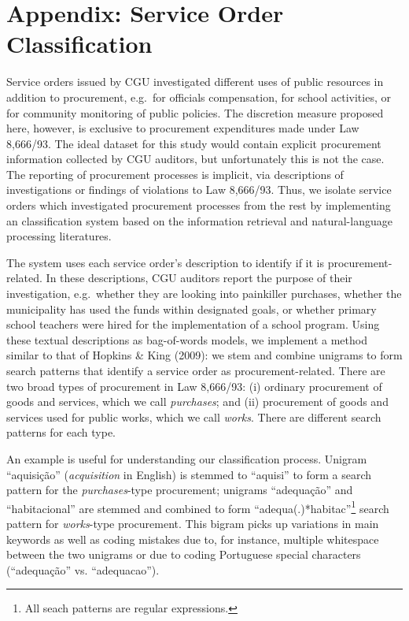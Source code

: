 \documentclass[]{article}
\title{}
\author{}
\date{}
\let\rmarkdownfootnote\footnote%
\def\footnote{\protect\rmarkdownfootnote}
\theoremstyle{definition}
\theoremstyle{definition}
\theoremstyle{definition}
\theoremstyle{remark}
\begin{document}
\hypertarget{appendix-appendix}{%
\appendix}


\hypertarget{appendixA}{%
\section{Appendix: Service Order Classification}\label{appendixA}}

Service orders issued by CGU investigated different uses of public
resources in addition to procurement, e.g.~for officials compensation,
for school activities, or for community monitoring of public policies.
The discretion measure proposed here, however, is exclusive to
procurement expenditures made under Law 8,666/93. The ideal dataset for
this study would contain explicit procurement information collected by
CGU auditors, but unfortunately this is not the case. The reporting of
procurement processes is implicit, via descriptions of investigations or
findings of violations to Law 8,666/93. Thus, we isolate service orders
which investigated procurement processes from the rest by implementing
an classification system based on the information retrieval and
natural-language processing literatures.

The system uses each service order's description to identify if it is
procurement-related. In these descriptions, CGU auditors report the
purpose of their investigation, e.g.~whether they are looking into
painkiller purchases, whether the municipality has used the funds within
designated goals, or whether primary school teachers were hired for the
implementation of a school program. Using these textual descriptions as
bag-of-words models, we implement a method similar to that of Hopkins \&
King (2009): we stem and combine unigrams to form search patterns that
identify a service order as procurement-related. There are two broad
types of procurement in Law 8,666/93: (i) ordinary procurement of goods
and services, which we call \emph{purchases}; and (ii) procurement of
goods and services used for public works, which we call \emph{works}.
There are different search patterns for each type.

An example is useful for understanding our classification process.
Unigram ``aquisição'' (\emph{acquisition} in English) is stemmed to
``aquisi'' to form a search pattern for the \emph{purchases}-type
procurement; unigrams ``adequação'' and ``habitacional'' are stemmed and
combined to form ``adequa(.)*habitac''\footnote{All seach patterns are
  regular expressions.} search pattern for \emph{works}-type
procurement. This bigram picks up variations in main keywords as well as
coding mistakes due to, for instance, multiple whitespace between the
two unigrams or due to coding Portuguese special characters
(``adequação'' vs. ``adequacao'').
\end{document}
